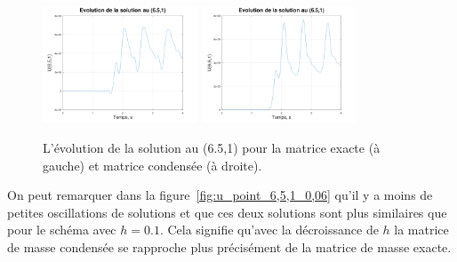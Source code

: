 \documentclass[12pt]{article}
\begin{document}
\begin{figure}[H]
	\hspace{1cm}\includegraphics[width=0.41\textwidth]{images/u_6,5,1_0,06}\hspace{1cm}
	\includegraphics[width=0.41\textwidth]{images/u_6,5,1_0,06_condense}\hspace{1cm}
	\caption{L'évolution de la solution au (6.5,1) pour la matrice exacte (à gauche) et matrice condensée (à droite).}
	\label{fig:u_point_6,5,1_0,06}
\end{figure}
On peut remarquer dans la figure~\eqref{fig:u_point_6,5,1_0,06} qu'il y a moins de petites oscillations de solutions et que ces deux solutions sont plus similaires que pour le schéma avec $h=0.1$. Cela signifie qu'avec la décroissance de $h$ la matrice de masse condensée se rapproche plus précisément de la matrice de masse exacte.
\end{document}

